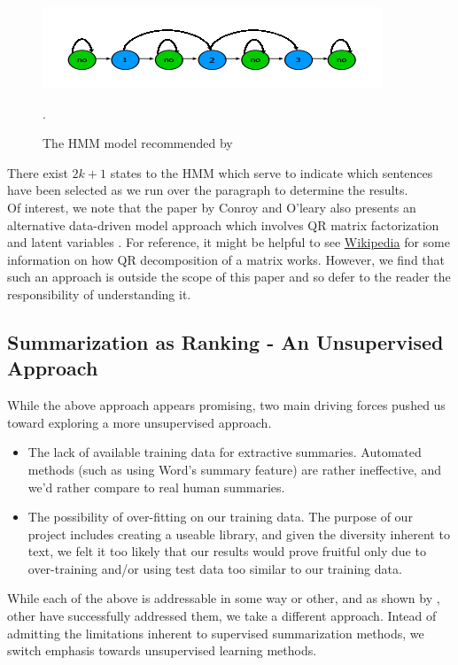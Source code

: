 \documentclass[10pt]{article}
\begin{document}
\begin{figure}[h!]
\centering
\includegraphics[]{hmm_model}
\caption{The HMM model recommended by \cite{hmm_summary}}.
\label{fig:hmm_model}
\end{figure}
There exist $2k+1$ states to the HMM which serve to indicate which sentences have been selected as we run over the paragraph to determine the results. \\

Of interest, we note that the paper by Conroy and O'leary also presents an alternative data-driven model approach which involves QR matrix factorization and latent variables \cite{hmm_summary}. For reference, it might be helpful to see \href{https://en.wikipedia.org/wiki/QR_decomposition}{Wikipedia} for some information on how QR decomposition of a matrix works. However, we find that such an approach is outside the scope of this paper and so defer to the reader the responsibility of understanding it.

\subsection{Summarization as Ranking - An Unsupervised Approach}
While the above approach appears promising, two main driving forces pushed us toward exploring a more unsupervised approach.
\begin{itemize}
\item The lack of available training data for extractive summaries. Automated methods (such as using Word's summary feature) are rather ineffective, and we'd rather compare to real human summaries.
\item The possibility of over-fitting on our training data. The purpose of our project includes creating a useable library, and given the diversity inherent to text, we felt it too likely that our results would prove fruitful only due to over-training and/or using test data too similar to our training data.
\end{itemize}

While each of the above is addressable in some way or other, and as shown by \cite{survey}, other have successfully addressed them, we take a different approach. Intead of admitting the limitations inherent to supervised summarization methods, we switch emphasis towards unsupervised learning methods.
\end{document}
